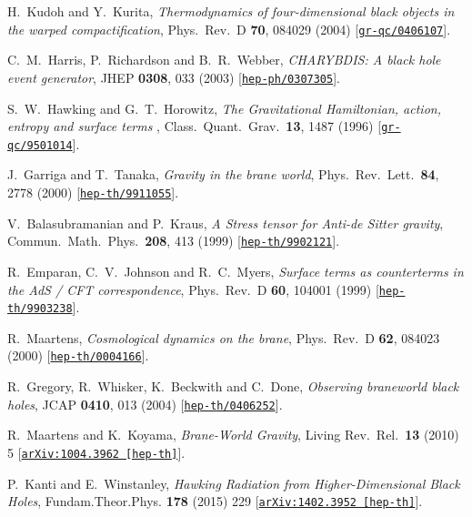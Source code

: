 \documentclass[aps,12pt,prd,superscriptaddress,preprintnumbers, 
	amssymb,
	amsmath,
	notitlepage,
	longbibliography,
	nofootinbib]{revtex4-1}
\begin{document}
\begin{thebibliography}{10}
H.~Kudoh and Y.~Kurita,
{\it Thermodynamics of four-dimensional black objects in the warped compactification},
Phys.\ Rev.\ D {\bf 70}, 084029 (2004)
[\href{http://xxx.lanl.gov/abs/gr-qc/0406107}{{\tt gr-qc/0406107}}].

C.~M.~Harris, P.~Richardson and B.~R.~Webber,
{\it CHARYBDIS: A black hole event generator},
JHEP {\bf 0308}, 033 (2003)
[\href{http://xxx.lanl.gov/abs/hep-ph/0307305}{{\tt hep-ph/0307305}}].

S.~W.~Hawking and G.~T.~Horowitz,
\textit{The Gravitational Hamiltonian, action, entropy and surface terms} ,
Class.\ Quant.\ Grav.\  {\bf 13}, 1487 (1996)
[\href{http://xxx.lanl.gov/abs/gr-qc/9501014}{{\tt gr-qc/9501014}}].

J.~Garriga and T.~Tanaka,
{\it Gravity in the brane world},
Phys.\ Rev.\ Lett.\  {\bf 84}, 2778 (2000)
[\href{http://xxx.lanl.gov/abs/hep-th/9911055}{{\tt hep-th/9911055}}].

V.~Balasubramanian and P.~Kraus,
{\it A Stress tensor for Anti-de Sitter gravity},
Commun.\ Math.\ Phys.\  {\bf 208}, 413 (1999)
[\href{http://xxx.lanl.gov/abs/hep-th/9902121}{{\tt hep-th/9902121}}].

R.~Emparan, C.~V.~Johnson and R.~C.~Myers,
{\it Surface terms as counterterms in the AdS / CFT correspondence},
Phys.\ Rev.\ D {\bf 60}, 104001 (1999)
[\href{http://xxx.lanl.gov/abs/hep-th/9903238}{{\tt hep-th/9903238}}].

R.~Maartens,
{\it Cosmological dynamics on the brane},
Phys.\ Rev.\ D {\bf 62}, 084023 (2000)
[\href{http://xxx.lanl.gov/abs/hep-th/0004166}{{\tt hep-th/0004166}}].

R.~Gregory, R.~Whisker, K.~Beckwith and C.~Done,
{\it Observing braneworld black holes},
JCAP {\bf 0410}, 013 (2004)
[\href{http://xxx.lanl.gov/abs/hep-th/0406252}{{\tt hep-th/0406252}}].

R.~Maartens and K.~Koyama,
{\it Brane-World Gravity},
Living Rev.\ Rel.\  {\bf 13} (2010) 5
[\href{http://xxx.lanl.gov/abs/1004.3962}{{\tt arXiv:1004.3962 [hep-th]}}].
  
P.~Kanti and E.~Winstanley,
{\it Hawking Radiation from Higher-Dimensional Black Holes},
Fundam.Theor.Phys. {\bf 178} (2015) 229
[\href{http://xxx.lanl.gov/abs/1402.3952}{{\tt arXiv:1402.3952 [hep-th]}}].  


\end{thebibliography}
\end{document}
